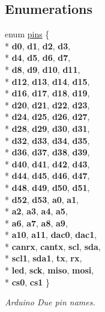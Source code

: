 \subsection*{Enumerations}
\begin{DoxyCompactItemize}
\item 
enum \hyperlink{namespacedue_a8ffa3ec309934ff9db34317e504bcc92}{pins} \{ \\*
{\bfseries d0}, 
{\bfseries d1}, 
{\bfseries d2}, 
{\bfseries d3}, 
\\*
{\bfseries d4}, 
{\bfseries d5}, 
{\bfseries d6}, 
{\bfseries d7}, 
\\*
{\bfseries d8}, 
{\bfseries d9}, 
{\bfseries d10}, 
{\bfseries d11}, 
\\*
{\bfseries d12}, 
{\bfseries d13}, 
{\bfseries d14}, 
{\bfseries d15}, 
\\*
{\bfseries d16}, 
{\bfseries d17}, 
{\bfseries d18}, 
{\bfseries d19}, 
\\*
{\bfseries d20}, 
{\bfseries d21}, 
{\bfseries d22}, 
{\bfseries d23}, 
\\*
{\bfseries d24}, 
{\bfseries d25}, 
{\bfseries d26}, 
{\bfseries d27}, 
\\*
{\bfseries d28}, 
{\bfseries d29}, 
{\bfseries d30}, 
{\bfseries d31}, 
\\*
{\bfseries d32}, 
{\bfseries d33}, 
{\bfseries d34}, 
{\bfseries d35}, 
\\*
{\bfseries d36}, 
{\bfseries d37}, 
{\bfseries d38}, 
{\bfseries d39}, 
\\*
{\bfseries d40}, 
{\bfseries d41}, 
{\bfseries d42}, 
{\bfseries d43}, 
\\*
{\bfseries d44}, 
{\bfseries d45}, 
{\bfseries d46}, 
{\bfseries d47}, 
\\*
{\bfseries d48}, 
{\bfseries d49}, 
{\bfseries d50}, 
{\bfseries d51}, 
\\*
{\bfseries d52}, 
{\bfseries d53}, 
{\bfseries a0}, 
{\bfseries a1}, 
\\*
{\bfseries a2}, 
{\bfseries a3}, 
{\bfseries a4}, 
{\bfseries a5}, 
\\*
{\bfseries a6}, 
{\bfseries a7}, 
{\bfseries a8}, 
{\bfseries a9}, 
\\*
{\bfseries a10}, 
{\bfseries a11}, 
{\bfseries dac0}, 
{\bfseries dac1}, 
\\*
{\bfseries canrx}, 
{\bfseries cantx}, 
{\bfseries scl}, 
{\bfseries sda}, 
\\*
{\bfseries scl1}, 
{\bfseries sda1}, 
{\bfseries tx}, 
{\bfseries rx}, 
\\*
{\bfseries led}, 
{\bfseries sck}, 
{\bfseries miso}, 
{\bfseries mosi}, 
\\*
{\bfseries cs0}, 
{\bfseries cs1}
 \}\begin{DoxyCompactList}\small\item\em Arduino Due pin names. \end{DoxyCompactList}
\end{DoxyCompactItemize}


